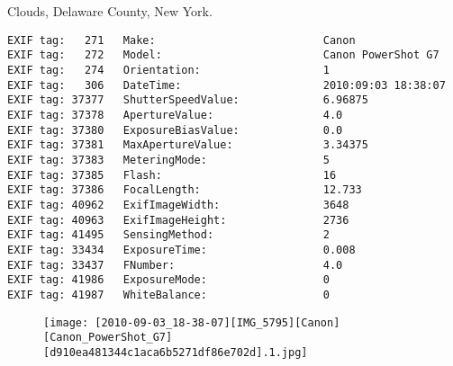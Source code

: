 \section{\protect{}}
\noindent Clouds, Delaware County, New York.
\noindent
\begin{lstlisting}
EXIF tag:   271   Make:                          Canon
EXIF tag:   272   Model:                         Canon PowerShot G7
EXIF tag:   274   Orientation:                   1
EXIF tag:   306   DateTime:                      2010:09:03 18:38:07
EXIF tag: 37377   ShutterSpeedValue:             6.96875
EXIF tag: 37378   ApertureValue:                 4.0
EXIF tag: 37380   ExposureBiasValue:             0.0
EXIF tag: 37381   MaxApertureValue:              3.34375
EXIF tag: 37383   MeteringMode:                  5
EXIF tag: 37385   Flash:                         16
EXIF tag: 37386   FocalLength:                   12.733
EXIF tag: 40962   ExifImageWidth:                3648
EXIF tag: 40963   ExifImageHeight:               2736
EXIF tag: 41495   SensingMethod:                 2
EXIF tag: 33434   ExposureTime:                  0.008
EXIF tag: 33437   FNumber:                       4.0
EXIF tag: 41986   ExposureMode:                  0
EXIF tag: 41987   WhiteBalance:                  0

\end{lstlisting}
\clearpage
\begin{figure}
\raggedleft
\texttt{[image: [2010-09-03\_18-38-07][IMG\_5795][Canon][Canon\_PowerShot\_G7][d910ea481344c1aca6b5271df86e702d].1.jpg]}
\end{figure}


\clearpage

